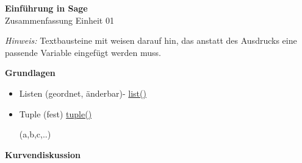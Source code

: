 \documentclass[a4paper,9pt,DIV15,twocolumn]{scrartcl}
\begin{document}
\begin{center}
    \textbf{\LARGE Einf\"uhrung in Sage}\\
    {\large Zusammenfassung Einheit 01}
\end{center}
\textsl{Hinweis:} Textbausteine mit  weisen darauf hin, das anstatt des Ausdrucks eine passende Variable eingefügt werden muss.

\medskip
\textbf{Grundlagen}
\begin{itemize}
    \item Listen (geordnet, änderbar)- \href{http://docs.python.org/library/functions.html#list}{list()}
        \begin{sagein}
[a,b,c,..]
        \end{sagein}
    \item Tuple (fest) \href{http://docs.python.org/library/functions.html#tuple}{tuple()}
        \begin{sagein}
(a,b,c,..)
        \end{sagein}
\end{itemize}  
\textbf{Kurvendiskussion}
\end{document}
